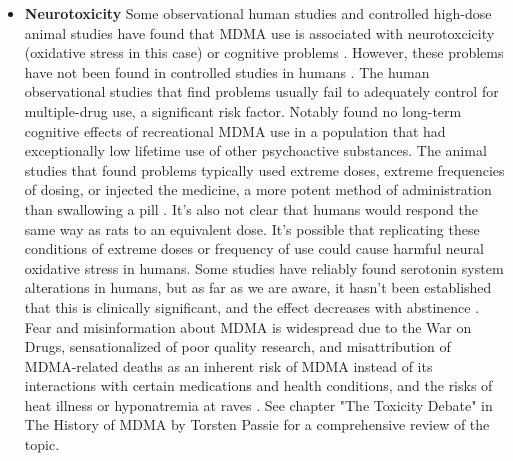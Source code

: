\documentclass[12pt,letterpaper]{book}
\begin{document}
\begin{itemize}
    \item \textbf{Neurotoxicity}
    	Some observational human studies and controlled high-dose animal studies have found that MDMA use is associated with neurotoxcicity (oxidative stress in this case) or cognitive problems \cite{passieHistory}. However, these problems have not been found in controlled studies in humans \cite{halpernMormonRavers}. The human observational studies that find problems usually fail to adequately control for multiple-drug use, a significant risk factor. Notably \textcite{halpernMormonRavers} found no long-term cognitive effects of recreational MDMA use in a population that had exceptionally low lifetime use of other psychoactive substances. The animal studies that found problems typically used extreme doses, extreme frequencies of dosing, or injected the medicine, a more potent method of administration than swallowing a pill \cite{passieHistory}. It's also not clear that humans would respond the same way as rats to an equivalent dose. It's possible that replicating these conditions of extreme doses or frequency of use could cause harmful neural oxidative stress in humans. Some studies have reliably found serotonin system alterations in humans, but as far as we are aware, it hasn't been established that this is clinically significant, and the effect decreases with abstinence \cite{gouzoulis2006neurotoxicity}. Fear and misinformation about MDMA is widespread due to the War on Drugs, sensationalized of poor quality research, and misattribution of MDMA-related deaths as an inherent risk of MDMA instead of its interactions with certain medications and health conditions, and the risks of heat illness or hyponatremia at raves \cite{passieHistory}. See chapter "The Toxicity Debate" in The History of MDMA by Torsten Passie for a comprehensive review of the topic.
	

\end{itemize}
\end{document}
